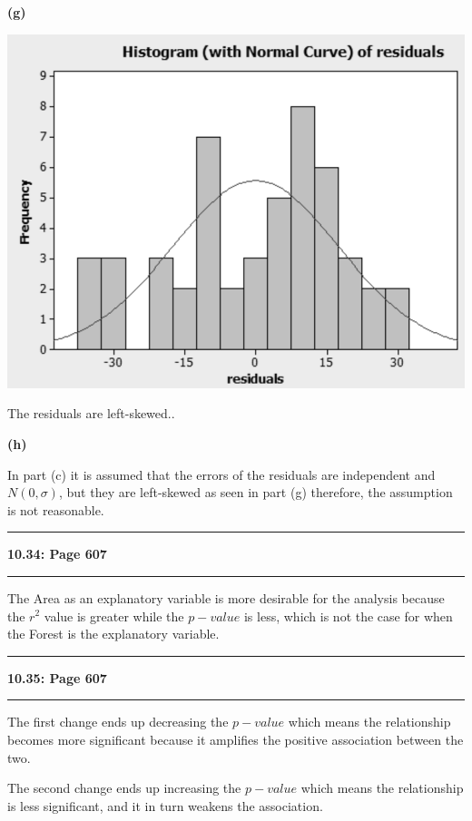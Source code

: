 \documentclass[11pt]{article}
\newcommand\question[2]{\vspace{.25in}\hrule\textbf{#1: #2}\vspace{.5em}\hrule\vspace{.10in}}
\renewcommand\part[1]{\vspace{.10in}\textbf{(#1)}\par}
\begin{document}
	\part{g}
		\begin{center}
			\includegraphics[scale=0.5]{images/ah3.png}
		\end{center}\par
		The residuals are left-skewed..\par
		
	\part{h}
		In part (c) it is assumed that the errors of the residuals are independent and $N(0, \sigma)$, but they are left-skewed as seen in part (g) therefore, the assumption is not reasonable.\par
		
		
\question{10.34}{Page 607}
	The Area as an explanatory variable is more desirable for the analysis because the $r^{2}$ value is greater while the $p-value$ is less, which is not the case for when the Forest is the explanatory variable.


\question{10.35}{Page 607}
	The first change ends up decreasing the $p-value$ which means the relationship becomes more significant because it amplifies the positive association between the two.\par
	The second change ends up increasing the $p-value$ which means the relationship is less significant, and it in turn weakens the association.\par
\end{document}
